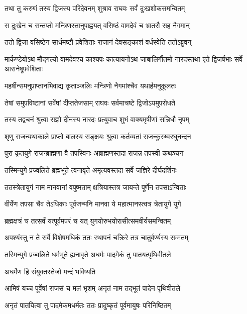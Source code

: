 
\twolineshloka
{तथा तु करुणं तस्य द्विजस्य परिदेवनम्}
{शुश्राव राघवः सर्वं दुःखशोकसमन्वितम्} %

\twolineshloka
{स दुःखेन च सन्तप्तो मन्त्रिणस्तानुपाह्वयत्}
{वसिष्ठं वामदेवं च भ्रातरौ सह नैगमान्} %

\twolineshloka
{ततो द्विजा वसिष्ठेन सार्धमष्टौ प्रवेशिताः}
{राजानं देवसङ्काशं वर्धस्वेति ततोऽब्रुवन्} %

\threelineshloka
{मार्कण्डेयोऽथ मौद्गल्यो वामदेवश्च काश्यपः}
{कात्यायनोऽथ जाबालिर्गौतमो नारदस्तथा}
{एते द्विजर्षभाः सर्वे आसनेषूपवेशिताः} %

\twolineshloka
{महर्षीन्समनुप्राप्तानभिवाद्य कृताञ्जलिः}
{मन्त्रिणो नैगमांश्चैव यथार्हमनुकूलतः} %

\twolineshloka
{तेषां समुपविष्टानां सर्वेषां दीप्ततेजसाम्}
{राघवः सर्वमाचष्टे द्विजोऽयमुपरोधते} %

\twolineshloka
{तस्य तद्वचनं श्रुत्वा राज्ञो दीनस्य नारदः}
{प्रत्युवाच शुभं वाक्यमृषीणां सन्निधौ नृपम्} %

\twolineshloka
{शृणु राजन्यथाकाले प्राप्तो बालस्य सङ्क्षयः}
{श्रुत्वा कर्तव्यतां राजन्कुरुष्वरघुनन्दन} %

\twolineshloka
{पुरा कृतयुगे राजन्ब्राह्मणा वै तपस्विनः}
{अब्राह्मणस्तदा राजन्न तपस्वी कथञ्चन} %

\twolineshloka
{तस्मिन्युगे प्रज्वलिते ब्रह्मभूते त्वनावृते}
{अमृत्यवस्तदा सर्वे जज्ञिरे दीर्घदर्शिनः} %

\twolineshloka
{ततस्त्रेतायुगं नाम मानवानां वपुष्मताम्}
{क्षत्रियास्तत्र जायन्ते पूर्णेन तपसाऽन्विताः} %

\twolineshloka
{वीर्येण तपसा चैव तेऽधिकाः पूर्वजन्मनि}
{मानवा ये महात्मानस्त्वत्र त्रेतायुगे युगे} %

\twolineshloka
{ब्रह्मक्षत्रं च तत्सर्वं यत्पूर्वमपरं च यत्}
{युगयोरुभयोरासीत्समवीर्यसमन्वितम्} %

\twolineshloka
{अपश्यंस्तु न ते सर्वे विशेषमधिकं ततः}
{स्थापनं चक्रिरे तत्र चातुर्वर्ण्यस्य सम्मतम्} %

\twolineshloka
{तस्मिन्युगे प्रज्वलिते धर्मभूते ह्यनावृते}
{अधर्मः पादमेकं तु पातयत्पृथिवीतले} %

\onelineshloka
{अधर्मेण हि संयुक्तस्तेजो मन्दं भविष्यति} %

\twolineshloka
{आमिषं यच्च पूर्वेषां राजसं च मलं भृशम्}
{अनृतं नाम तद्भूतं पादेन पृथिवीतले} %

\twolineshloka
{अनृतं पातयित्वा तु पादमेकमधर्मतः}
{ततः प्रादुष्कृतं पूर्वमायुषः परिनिष्ठितम्} %

